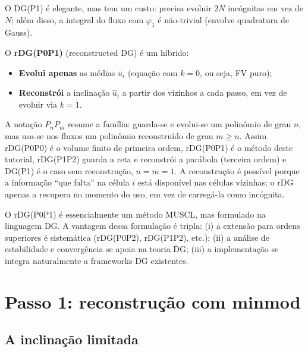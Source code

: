 \documentclass[10pt,a4paper]{article}
\newcommand{\ub}{\bar u}
\newcommand{\uh}{\hat u}
\begin{document}
O DG(P1) é elegante, mas tem um custo: precisa evoluir $2N$ incógnitas em vez de $N$; além disso, a integral do fluxo com $\varphi_1$ é não-trivial (envolve quadratura de Gauss).

O \textbf{rDG(P0P1)} (reconstructed DG) é um híbrido:
\begin{destaque}
\begin{itemize}[leftmargin=1.8em,itemsep=3pt]
\item \textbf{Evolui apenas} as médias $\ub_i$ (equação com $k=0$, ou seja, FV puro);
\item \textbf{Reconstrói} a inclinação $\uh_i$ a partir dos vizinhos a cada passo, em vez de evoluir via $k=1$.
\end{itemize}
\end{destaque}

A notação $P_nP_m$ resume a família: guarda-se e evolui-se um polinômio de grau $n$, mas usa-se nos fluxos um polinômio reconstruído de grau $m\ge n$. Assim rDG(P0P0) é o volume finito de primeira ordem, rDG(P0P1) é o método deste tutorial, rDG(P1P2) guarda a reta e reconstrói a parábola (terceira ordem) e DG(P1) é o caso sem reconstrução, $n=m=1$. A reconstrução é possível porque a informação ``que falta'' na célula $i$ está disponível nas células vizinhas; o rDG apenas a recupera no momento do uso, em vez de carregá-la como incógnita.

\begin{intuicao}
O rDG(P0P1) é essencialmente um método MUSCL, mas formulado na linguagem DG. A vantagem dessa formulação é tripla: (i) a extensão para ordens superiores é sistemática (rDG(P0P2), rDG(P1P2), etc.); (ii) a análise de estabilidade e convergência se apoia na teoria DG; (iii) a implementação se integra naturalmente a frameworks DG existentes.
\end{intuicao}

\section{Passo 1: reconstrução com minmod}

\subsection{A inclinação limitada}
\end{document}
